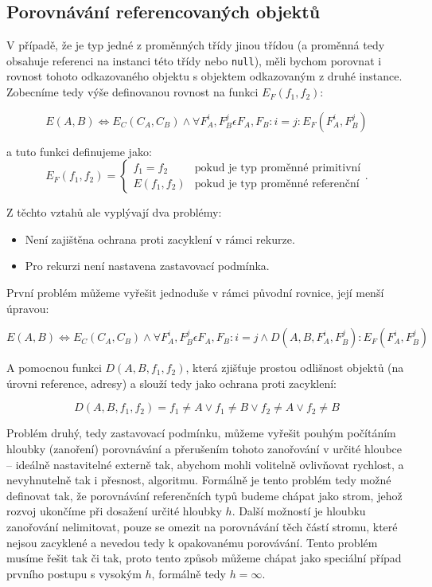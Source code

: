 \subsection{Porovnávání referencovaných objektů}
V případě, že je typ jedné z proměnných třídy jinou třídou (a proměnná tedy obsahuje referenci na instanci této třídy nebo \texttt{null}), měli bychom porovnat i rovnost tohoto odkazovaného objektu s objektem odkazovaným z druhé instance. Zobecníme tedy výše definovanou rovnost na funkci $E_F(f_1, f_2)$:

\begin{equation}
E(A, B) \Leftrightarrow E_C(C_A, C_B) \wedge \forall F_A^i, F_B^j \epsilon F_A, F_B: i = j: E_F(F_A^i, F_B^j)
\end{equation}

a tuto funkci definujeme jako:
\begin{equation}
    E_F(f_1, f_2)=
      \begin{cases}
        f_1 = f_2 & \text{pokud je typ proměnné primitivní} \\
        E(f_1, f_2) & \text{pokud je typ proměnné referenční}
      \end{cases}.
\end{equation}

Z těchto vztahů ale vyplývají dva problémy:

\begin{itemize}
    \item Není zajištěna ochrana proti zacyklení v rámci rekurze.
    \item Pro rekurzi není nastavena zastavovací podmínka.
\end{itemize}

První problém můžeme vyřešit jednoduše v rámci původní rovnice, její menší úpravou:

\begin{equation}
E(A, B) \Leftrightarrow E_C(C_A, C_B) \wedge \forall F_A^i, F_B^j \epsilon F_A, F_B: i = j \wedge D(A, B, F_A^i, F_B^j) : E_F(F_A^i, F_B^j)
\end{equation}

A pomocnou funkci $D(A, B, f_1, f_2)$, která zjišťuje prostou odlišnost objektů (na úrovni reference, adresy) a slouží tedy jako ochrana proti zacyklení:

\begin{equation}
    D(A, B, f_1, f_2) = f_1 \neq A \vee f_1 \neq B \vee f_2 \neq A \vee f_2 \neq B
\end{equation}

Problém druhý, tedy zastavovací podmínku, můžeme vyřešit pouhým počítáním hloubky (zanoření) porovnávání a přerušením tohoto zanořování v určité hloubce -- ideálně nastavitelné externě tak, abychom mohli volitelně ovlivňovat rychlost, a nevyhnutelně tak i přesnost, algoritmu. Formálně je tento problém tedy možné definovat tak, že porovnávání referenčních typů budeme chápat jako strom, jehož rozvoj ukončíme při dosažení určité hloubky $h$. Další možností je hloubku zanořování nelimitovat, pouze se omezit na porovnávání těch částí stromu, které nejsou zacyklené a nevedou tedy k opakovanému porovávání. Tento problém musíme řešit tak či tak, proto tento způsob můžeme chápat jako speciální případ prvního postupu s vysokým $h$, formálně tedy $h=\infty$.

